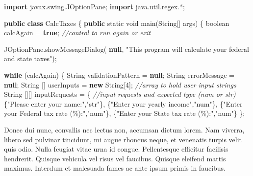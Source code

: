 \documentclass[\pandocDocMode,longtable, floatsintext, noextraspace]{apa6}
\newenvironment{Shaded}{}{}
\newcommand{\BuiltInTok}[1]{#1}
\newcommand{\CommentTok}[1]{\textcolor[rgb]{0.38,0.63,0.69}{\textit{#1}}}
\newcommand{\ControlFlowTok}[1]{\textcolor[rgb]{0.00,0.44,0.13}{\textbf{#1}}}
\newcommand{\DataTypeTok}[1]{\textcolor[rgb]{0.56,0.13,0.00}{#1}}
\newcommand{\DecValTok}[1]{\textcolor[rgb]{0.25,0.63,0.44}{#1}}
\newcommand{\FunctionTok}[1]{\textcolor[rgb]{0.02,0.16,0.49}{#1}}
\newcommand{\ImportTok}[1]{#1}
\newcommand{\KeywordTok}[1]{\textcolor[rgb]{0.00,0.44,0.13}{\textbf{#1}}}
\newcommand{\NormalTok}[1]{#1}
\newcommand{\OperatorTok}[1]{\textcolor[rgb]{0.40,0.40,0.40}{#1}}
\newcommand{\StringTok}[1]{\textcolor[rgb]{0.25,0.44,0.63}{#1}}
\begin{document}
\hypertarget{mycode}{%
\label{mycode}}%
\begin{Shaded}
\begin{Highlighting}[numbers=left,,firstnumber=100,]
\KeywordTok{import} \ImportTok{javax}\OperatorTok{.}\ImportTok{swing}\OperatorTok{.}\ImportTok{JOptionPane}\OperatorTok{;}
\KeywordTok{import} \ImportTok{java}\OperatorTok{.}\ImportTok{util}\OperatorTok{.}\ImportTok{regex}\OperatorTok{.*;}

\KeywordTok{public} \KeywordTok{class}\NormalTok{ CalcTaxes }\OperatorTok{\{}
    \KeywordTok{public} \DataTypeTok{static} \DataTypeTok{void} \FunctionTok{main}\OperatorTok{(}\BuiltInTok{String}\OperatorTok{[]}\NormalTok{ args}\OperatorTok{)} \OperatorTok{\{}
        \DataTypeTok{boolean}\NormalTok{ calcAgain }\OperatorTok{=} \KeywordTok{true}\OperatorTok{;} \CommentTok{//control to run again or exit}

        \BuiltInTok{JOptionPane}\OperatorTok{.}\FunctionTok{showMessageDialog}\OperatorTok{(}
            \KeywordTok{null}\OperatorTok{,} \StringTok{"This program will calculate your federal and state taxes"}\OperatorTok{);}

        \ControlFlowTok{while} \OperatorTok{(}\NormalTok{calcAgain}\OperatorTok{)} \OperatorTok{\{}
            \BuiltInTok{String}\NormalTok{ validationPattern }\OperatorTok{=} \KeywordTok{null}\OperatorTok{;}
            \BuiltInTok{String}\NormalTok{ errorMessage }\OperatorTok{=} \KeywordTok{null}\OperatorTok{;}
            \BuiltInTok{String} \OperatorTok{[]}\NormalTok{ userInputs }\OperatorTok{=} \KeywordTok{new} \BuiltInTok{String}\OperatorTok{[}\DecValTok{4}\OperatorTok{];} \CommentTok{//array to hold user input strings}
            \BuiltInTok{String} \OperatorTok{[][]}\NormalTok{ inputRequests }\OperatorTok{=} \OperatorTok{\{} \CommentTok{//input requests and expected type (num or str)}
                \OperatorTok{\{}\StringTok{"Please enter your name:"}\OperatorTok{,}\StringTok{"str"}\OperatorTok{\},}
                \OperatorTok{\{}\StringTok{"Enter your yearly income"}\OperatorTok{,}\StringTok{"num"}\OperatorTok{\},}
                \OperatorTok{\{}\StringTok{"Enter your Federal tax rate (\%):"}\OperatorTok{,}\StringTok{"num"}\OperatorTok{\},}
                \OperatorTok{\{}\StringTok{"Enter your State tax rate (\%):"}\OperatorTok{,}\StringTok{"num"}\OperatorTok{\}}
            \OperatorTok{\};}
\end{Highlighting}
\end{Shaded}

Donec dui nunc, convallis nec lectus non, accumsan dictum lorem. Nam
viverra, libero sed pulvinar tincidunt, mi augue rhoncus neque, et
venenatis turpis velit quis odio. Nulla feugiat vitae urna id congue.
Pellentesque efficitur facilisis hendrerit. Quisque vehicula vel risus
vel faucibus. Quisque eleifend mattis maximus. Interdum et malesuada
fames ac ante ipsum primis in faucibus.
\end{document}
